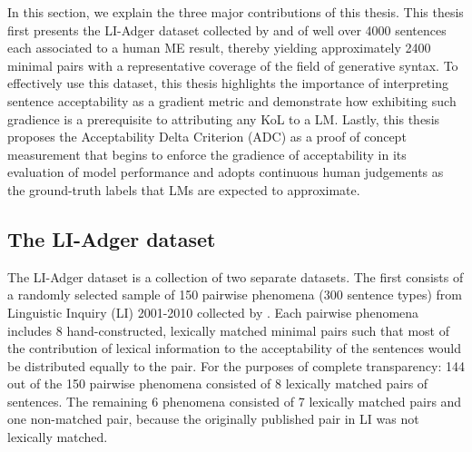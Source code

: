 In this section, we explain the three major contributions of this thesis.  This thesis first presents the LI-Adger dataset collected by \citet{sprouse2012assessing} and \citet{sprouse2013comparison} of well over 4000 sentences each associated to a human ME result, thereby yielding approximately 2400 minimal pairs with a representative coverage of the field of generative syntax.  To effectively use this dataset, this thesis highlights the importance of interpreting sentence acceptability as a gradient metric and demonstrate how exhibiting such gradience is a prerequisite to attributing any KoL to a LM.  Lastly, this thesis proposes the Acceptability Delta Criterion (ADC) as a proof of concept measurement that begins to enforce the gradience of acceptability in its evaluation of model performance and adopts continuous human judgements as the ground-truth labels that LMs are expected to approximate.

\subsection{The LI-Adger dataset}
The LI-Adger dataset is a collection of two separate datasets.  The first consists of a randomly selected sample of 150 pairwise phenomena (300 sentence types) from Linguistic Inquiry (LI) 2001-2010 collected by \citet{sprouse2013comparison}.  Each pairwise phenomena includes 8 hand-constructed, lexically matched minimal pairs such that most of the contribution of lexical information to the acceptability of the sentences would be distributed equally to the pair. For the purposes of complete transparency: 144 out of the 150 pairwise phenomena consisted of 8 lexically matched pairs of sentences.  The remaining 6 phenomena consisted of 7 lexically matched pairs and one non-matched pair, because the originally published pair in LI was not lexically matched.

